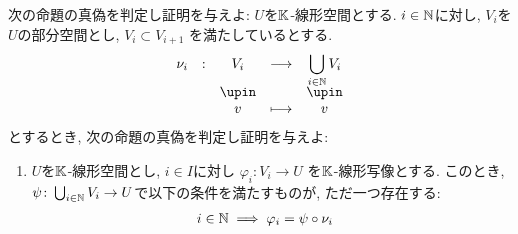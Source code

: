 \begin{quiz}
  次の命題の真偽を判定し証明を与えよ:
  $U$を$\mathbb{K}$-線形空間とする.
  $i\in \mathbb{N}$に対し,
  $V_i$を$U$の部分空間とし,
  $V_{i}\subset V_{i+1}$
  を満たしているとする.
  \begin{align*}
    \shazo{\nu_i}{V_i}{\bigcup_{i\in \NN}V_i}
    {v}{v}
  \end{align*}
  とするとき,
  次の命題の真偽を判定し証明を与えよ:
  \begin{enumerate}
  \item
    $U$を$\mathbb{K}$-線形空間とし,
    $i\in I$に対し
    $\varphi_i\colon  V_i \to U$
    を$\mathbb{K}$-線形写像とする.
    このとき,
    $\psi\colon \bigcup_{i\in \mathbb{N}} V_i\to U$で以下の条件を満たすものが,
    ただ一つ存在する:
    \begin{align*}
      i\in \mathbb{N}\implies \varphi_i&=\psi\circ\nu_i
    \end{align*}
  \end{enumerate}
\end{quiz}




